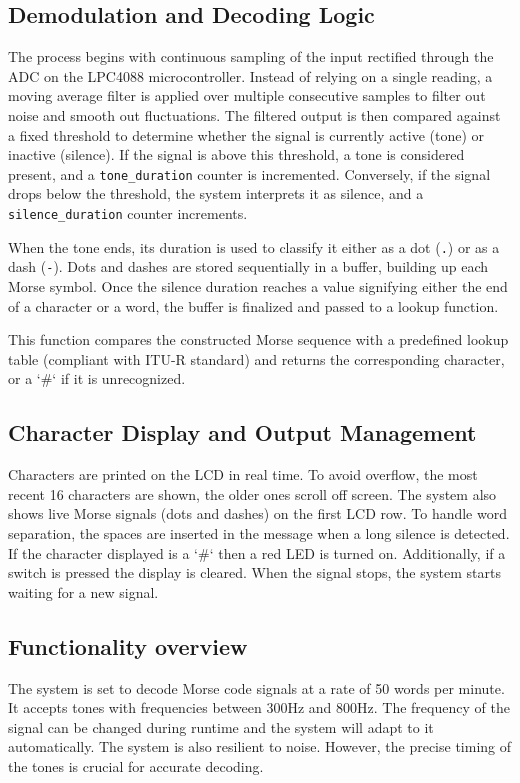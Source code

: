 \documentclass{article}
\begin{document}
\subsection{Demodulation and Decoding Logic} 
The process begins with continuous sampling of the input rectified through the ADC on the 
LPC4088 microcontroller. Instead of relying on a single reading,
a moving average filter is applied over multiple consecutive samples to filter out noise and smooth out
fluctuations.
 The filtered output is then compared against a fixed threshold to determine 
whether the signal is currently active (tone) or inactive (silence).
 If the signal is above this threshold, a tone is considered present, and a \texttt{tone\_duration}
  counter is incremented. Conversely, if the signal drops below the threshold, the system interprets 
  it as silence, and a \texttt{silence\_duration} counter increments. 

When the tone ends, its duration is used to classify it either as a dot (\texttt{.}) 
or as a dash (\texttt{-}). Dots and dashes are stored sequentially in a buffer, 
building up each Morse symbol. Once the silence duration reaches a value signifying 
either the end of a character or a word, the buffer is finalized and passed to a lookup function.

This function compares the constructed Morse sequence with a predefined lookup table
(compliant with ITU-R standard) and returns the corresponding character, or a `\#` if it is unrecognized. 

\subsection{Character Display and Output Management}
Characters are printed on the LCD in real time. To avoid overflow, 
the most recent 16 characters are shown, the older ones scroll off screen. 
The system also shows live Morse signals (dots and dashes) on the first LCD row.
To handle word separation, the spaces are inserted in the message when a long silence is detected. 
If the character displayed is a `\#` then a red LED is turned on. Additionally, if a switch is pressed 
the display is cleared. When the signal stops, the system starts waiting for a new signal.

\subsection{Functionality overview}
The system is set to decode Morse code signals at a rate of 50 words per minute. It accepts tones with
frequencies between 300Hz and 800Hz. The frequency of the signal can be changed during runtime
and the system will adapt to it automatically. The system is also resilient to noise. However,
the precise timing of the tones is crucial for accurate decoding.
\end{document}
